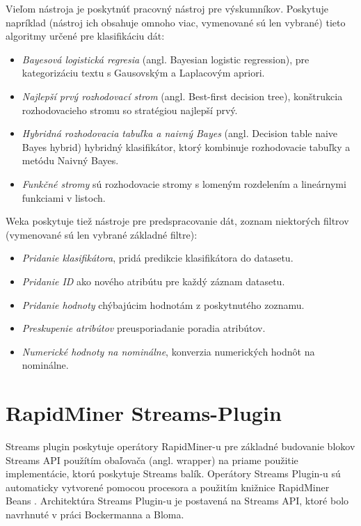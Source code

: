 Vieľom nástroja je poskytnúť pracovný nástroj pre výskumníkov. Poskytuje napríklad (nástroj ich obsahuje omnoho viac, vymenované sú len vybrané) tieto algoritmy určené pre klasifikáciu dát:
\begin{itemize}
	\item \textit{Bayesová logistická regresia} (angl. Bayesian logistic regression), pre kategorizáciu textu s Gausovským a Laplacovým apriori.
	\item \textit{Najlepší prvý rozhodovací strom} (angl. Best-first decision tree), konštrukcia rozhodovacieho stromu so stratégiou najlepší prvý.
	\item \textit{Hybridná rozhodovacia tabuľka a naivný Bayes} (angl. Decision table naive Bayes hybrid) hybridný klasifikátor, ktorý kombinuje rozhodovacie tabuľky a metódu Naivný Bayes.
	\item \textit{Funkčné stromy} sú rozhodovacie stromy s lomeným rozdelením a lineárnymi funkciami v listoch.
\end{itemize}
Weka poskytuje tiež nástroje pre predspracovanie dát, zoznam niektorých filtrov (vymenované sú len vybrané základné filtre):
\begin{itemize}
	\item \textit{Pridanie klasifikátora}, pridá predikcie klasifikátora do datasetu.
	\item \textit{Pridanie ID} ako nového atribútu pre každý záznam datasetu.
	\item \textit{Pridanie hodnoty} chýbajúcim hodnotám z poskytnutého zoznamu.
	\item \textit{Preskupenie atribútov} preusporiadanie poradia atribútov.
	\item \textit{Numerické hodnoty na nominálne}, konverzia numerických hodnôt na nominálne.
\end{itemize}
\label{fig:weka}

\newpage
\section{RapidMiner Streams-Plugin}
Streams plugin poskytuje operátory RapidMiner-u pre základné budovanie blokov Streams API použítím obaľovača (angl. wrapper) na priame použitie implementácie, ktorú poskytuje Streams balík. Operátory Streams Plugin-u sú automaticky vytvorené pomocou procesora a použitím knižnice RapidMiner Beans \citep{bockermann2012processing}. Architektúra Streams Plugin-u je postavená na Streams API, ktoré bolo navrhnuté v práci Bockermanna a Bloma.
\label{fig:rapidminer}

